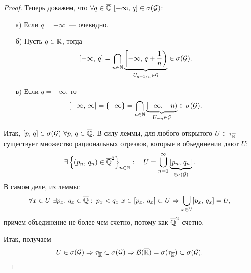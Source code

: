 \begin{claim}
\begin{proof}
        Теперь докажем, что $\forall q\in\overline{\mathbb{Q}}\ [-\infty,\, q]\in\sigma(\mathcal{G})$:
        \begin{enumerate}
            \item[а)] Если $q=+\infty$~--- очевидно.
            \item[б)] Пусть $q\in\mathbb{R}$, тогда
                  \[
                      [-\infty,\, q]=\bigcap_{n\in\mathbb{N}}\underbrace{\left[-\infty,\, q+\dfrac{1}{n}\right)}_{U_{q+1/n}\in\mathcal{G}}\in\sigma(\mathcal{G}).
                  \]
            \item[в)] Если $q=-\infty$, то
                  \[
                      [-\infty,\, \infty]=\{-\infty\}=\bigcap_{n\in\mathbb{N}}\underbrace{[-\infty,\, -n)}_{U_{-n}\in\mathcal{G}}\in\sigma(\mathcal{G}).
                  \]
        \end{enumerate}

        Итак, $[p,\, q]\in\sigma(\mathcal{G})\ \forall p,\,q\in\overline{\mathbb{Q}}$.
        В силу леммы, для любого открытого $U\in\tau_{\overline{\mathbb{R}}}$ существует множество рациональных отрезков, которые в объединении дают $U$:
        \[
            \exists\left\{(p_n,\, q_n)\in\overline{\mathbb{Q}}^2\right\}_{n\in\mathbb{N}}:\quad U=\bigcup_{n=1}^{\infty}\underbrace{[p_n,\, q_n]}_{\in\sigma(\mathcal{G})}.
        \]
        В самом деле, из леммы: \[
            \forall x\in U\ \exists p_x,\, q_x\in\overline{\mathbb{Q}}:\: p_x<q_x\ x\in[p_x,\, q_x]\subset U\Rightarrow
            \bigcup_{x\in U}[p_x,\, q_x]=U,
        \]
        причем объединение не более чем счетно, потому как $\overline{\mathbb{Q}}^2$ счетно.

        Итак, получаем
        \[
            U\in\sigma(\mathcal{G})\Rightarrow\tau_{\overline{\mathbb{R}}}\subset\sigma(\mathcal{G})\Rightarrow
            \mathcal{B}(\overline{\mathbb{R}})=\sigma(\tau_{\overline{\mathbb{R}}})\subset\sigma(\mathcal{G}).
        \]

    \end{proof}
\end{claim}

